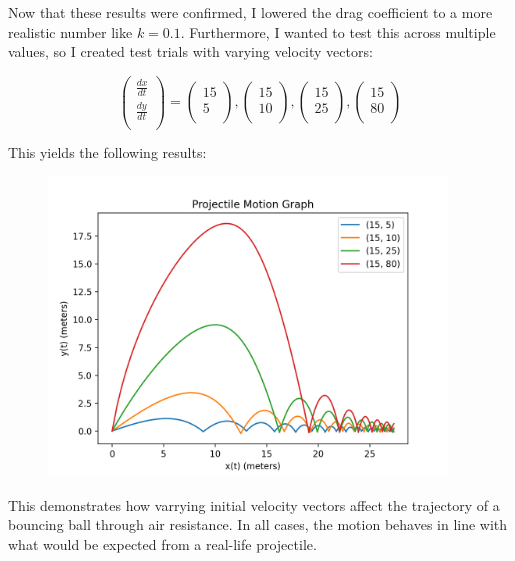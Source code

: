 \documentclass[12pt]{article}
\begin{document}
Now that these results were confirmed, I lowered the drag coefficient to a more realistic number like $k=0.1$. Furthermore, I wanted to test this across multiple values, so I created test trials with varying velocity vectors: 

$$
\begin{pmatrix} \frac{dx}{dt} \\ \frac{dy}{dt} \\
\end{pmatrix} = 
\begin{pmatrix} 15 \\ 5 \\
\end{pmatrix}, 
\begin{pmatrix} 15 \\ 10 \\
\end{pmatrix}, 
\begin{pmatrix} 15 \\ 25 \\
\end{pmatrix}, 
\begin{pmatrix} 15 \\ 80 \\
\end{pmatrix}
$$

This yields the following results:
\begin{figure}[H]
\centering
\includegraphics[width=300pt]{img/multiple.png}
\caption{\label{fig:1}}
\end{figure}

This demonstrates how varrying initial velocity vectors affect the trajectory of a bouncing ball through air resistance. In all cases, the motion behaves in line with what would be expected from a real-life projectile.
\end{document}
